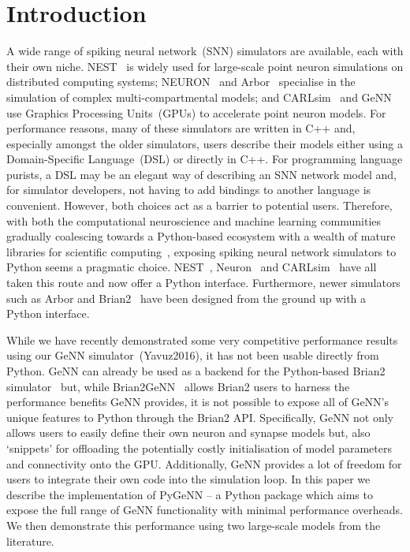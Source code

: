 \documentclass[utf8]{frontiersSCNS} %
\begin{document}
\section{Introduction}
A wide range of spiking neural network~(SNN) simulators are available, each with their own niche. 
NEST~\citep{Gewaltig2007} is widely used for large-scale point neuron simulations on distributed computing systems; NEURON~\citep{carnevale2006neuron} and Arbor~\citep{Akar2019} specialise in the simulation of complex multi-compartmental models; and CARLsim~\citep{Chou2018} and GeNN~\citep{Yavuz2016} use Graphics Processing Units~(GPUs) to accelerate point neuron models.
For performance reasons, many of these simulators are written in C++ and, especially amongst the older simulators, users describe their models either using a Domain-Specific Language~(DSL) or directly in C++.
For programming language purists, a DSL may be an elegant way of describing an SNN network model and, for simulator developers, not having to add bindings to another language is convenient.
However, both choices act as a barrier to potential users.
Therefore, with both the computational neuroscience and machine learning communities gradually coalescing towards a Python-based ecosystem with a wealth of mature libraries for scientific computing~\citep{Hunter2007,VanDerWalt2011,Millman2011}, exposing spiking neural network simulators to Python seems a pragmatic choice.
NEST~\citep{Eppler2009}, Neuron~\citep{Hines2009} and CARLsim~\citep{Balaji2020} have all taken this route and now offer a Python interface.
Furthermore, newer simulators such as Arbor and Brian2~\citep{Stimberg2019} have been designed from the ground up with a Python interface.

While we have recently demonstrated some very competitive performance results~\citep{Knight2020} using our GeNN simulator~(Yavuz2016), it has not been usable directly from Python.
GeNN can already be used as a backend for the Python-based Brian2 simulator~\citep{Stimberg2019} but, while Brian2GeNN~\citep{Stimberg2020} allows Brian2 users to harness the performance benefits GeNN provides, it is not possible to expose all of GeNN's unique features to Python through the Brian2 API.
Specifically, GeNN not only allows users to easily define their own neuron and synapse models but, also `snippets' for offloading the potentially costly initialisation of model parameters and connectivity onto the GPU.
Additionally, GeNN  provides a lot of freedom for users to integrate their own code into the simulation loop.
In this paper we describe the implementation of PyGeNN -- a Python package which aims to expose the full range of GeNN functionality with minimal performance overheads.
We then demonstrate this performance using two large-scale models from the literature.
\end{document}
